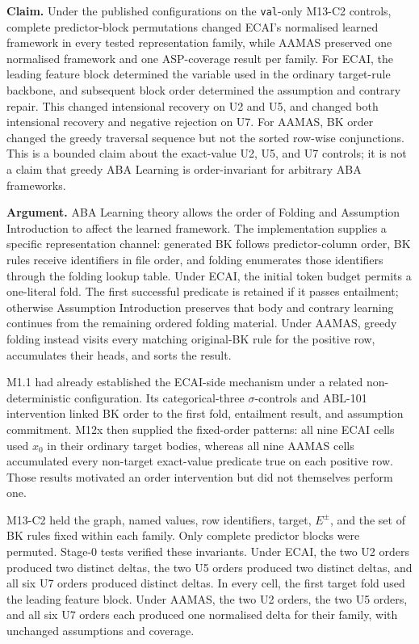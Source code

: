 \documentclass[11pt]{article}
\begin{document}
\textbf{Claim.} Under the published configurations on the \texttt{val}-only M13-C2 controls, complete predictor-block permutations changed ECAI's normalised learned framework in every tested representation family, while AAMAS preserved one normalised framework and one ASP-coverage result per family. For ECAI, the leading feature block determined the variable used in the ordinary target-rule backbone, and subsequent block order determined the assumption and contrary repair. This changed intensional recovery on U2 and U5, and changed both intensional recovery and negative rejection on U7. For AAMAS, BK order changed the greedy traversal sequence but not the sorted row-wise conjunctions. This is a bounded claim about the exact-value U2, U5, and U7 controls; it is not a claim that greedy ABA Learning is order-invariant for arbitrary ABA frameworks.

\textbf{Argument.} ABA Learning theory allows the order of Folding and Assumption Introduction to affect the learned framework. The implementation supplies a specific representation channel: generated BK follows predictor-column order, BK rules receive identifiers in file order, and folding enumerates those identifiers through the folding lookup table. Under ECAI, the initial token budget permits a one-literal fold. The first successful predicate is retained if it passes entailment; otherwise Assumption Introduction preserves that body and contrary learning continues from the remaining ordered folding material. Under AAMAS, greedy folding instead visits every matching original-BK rule for the positive row, accumulates their heads, and sorts the result.

M1.1 had already established the ECAI-side mechanism under a related non-deterministic configuration. Its categorical-three \(\sigma\)-controls and ABL-101 intervention linked BK order to the first fold, entailment result, and assumption commitment. M12x then supplied the fixed-order patterns: all nine ECAI cells used \(x_0\) in their ordinary target bodies, whereas all nine AAMAS cells accumulated every non-target exact-value predicate true on each positive row. Those results motivated an order intervention but did not themselves perform one.

M13-C2 held the graph, named values, row identifiers, target, \(E^\pm\), and the set of BK rules fixed within each family. Only complete predictor blocks were permuted. Stage-0 tests verified these invariants. Under ECAI, the two U2 orders produced two distinct deltas, the two U5 orders produced two distinct deltas, and all six U7 orders produced distinct deltas. In every cell, the first target fold used the leading feature block. Under AAMAS, the two U2 orders, the two U5 orders, and all six U7 orders each produced one normalised delta for their family, with unchanged assumptions and coverage.
\end{document}
